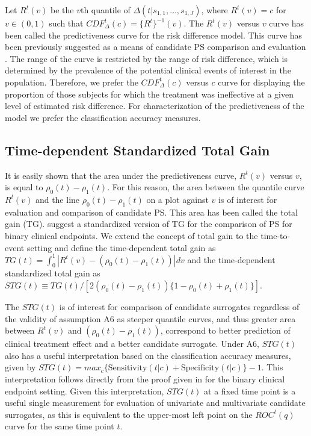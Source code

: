 \documentclass[times, doublespace]{simauth}
\begin{document}
Let $R^t(v)$ be the $v$th quantile of $\Delta(t|s_{1,1}, \dots, s_{1,J})$, where $R^t(v)=c$ for $v\in(0,1)$ such that $CDF^{t}_{\Delta}(c)=\{R^t\}^{-1}(v)$. The $R^t(v)$ versus $v$ curve has been called the predictiveness curve for the risk difference model. This curve has been previously suggested as a means of candidate PS comparison and evaluation \citep{Gilbert08}. The range of the curve is restricted by the range of risk difference, which is determined by the prevalence of the potential clinical events of interest in the population. Therefore, we prefer the $CDF^{t}_{\Delta}(c)$ versus $c$ curve for displaying the proportion of those subjects for which the treatment was ineffective at a given level of estimated risk difference. For characterization of the predictiveness of the model we prefer the classification accuracy measures.

\subsection{Time-dependent Standardized Total Gain} \label{STG}
It is easily shown that the area under the predictiveness curve, $R^t(v)$ versus $v$, is equal to $\rho_0(t)-\rho_1(t)$. For this reason, the area between the quantile curve $R^t(v)$ and the line $\rho_0(t)-\rho_1(t)$ on a plot against $v$ is of interest for evaluation and comparison of candidate PS. This area has been called the total gain (TG). \citet{Huang11} suggest a standardized version of TG for the comparison of PS for binary clinical endpoints. We extend the concept of total gain to the time-to-event setting and define the time-dependent total gain as $TG(t) = \int_0^{1}{|R^t(v) -(\rho_0(t) -\rho_1(t))|dv}$ and the time-dependent standardized total gain as $STG(t) \equiv TG(t)/[2(\rho_0(t) - \rho_1(t))\{1-\rho_0(t) + \rho_1(t)\}]$.

The $STG(t)$ is of interest for comparison of candidate surrogates regardless of the validity of assumption A6 as steeper quantile curves, and thus greater area between $R^t(v)$ and $(\rho_0(t) -\rho_1(t))$, correspond to better prediction of clinical treatment effect and a better candidate surrogate. Under A6, $STG(t)$ also has a useful interpretation based on the classification accuracy measures, given by $STG(t)=max_c\{\mbox{Sensitivity}(t|c) + \mbox{Specificity}(t|c)\} -1$. This interpretation follows directly from the proof given in \citet{Huang11} for the binary clinical endpoint setting. Given this interpretation, $STG(t)$ at a fixed time point is a useful single measurement for evaluation of univariate and multivariate candidate surrogates, as this is equivalent to the upper-most left point on the $ROC^{t}(q)$ curve for the same time point $t$.
\end{document}
